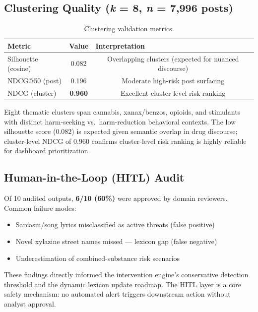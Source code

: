 \documentclass[10pt,twocolumn]{article}
\begin{document}
\subsection*{Clustering Quality (\textit{k} = 8, \textit{n} = 7,996 posts)}

\begin{table}[H]
\centering
\caption{Clustering validation metrics.}
\label{tab:clust}
\scriptsize
\begin{tabularx}{\columnwidth}{@{}lccX@{}}
  \toprule
  \textbf{Metric} & \textbf{Value} & \multicolumn{2}{l}{\textbf{Interpretation}} \\
  \midrule
  Silhouette (cosine) & 0.082 & \multicolumn{2}{X}{Overlapping clusters (expected for nuanced discourse)} \\
  NDCG@50 (post)      & 0.196 & \multicolumn{2}{X}{Moderate high-risk post surfacing} \\
  NDCG (cluster)      & \textbf{0.960} & \multicolumn{2}{X}{Excellent cluster-level risk ranking} \\
  \bottomrule
\end{tabularx}
\end{table}

Eight thematic clusters span cannabis, xanax/benzos, opioids, and stimulants with distinct harm-seeking vs.\ harm-reduction behavioral contexts. The low silhouette score ($0.082$) is expected given semantic overlap in drug discourse; cluster-level NDCG of $0.960$ confirms cluster-level risk ranking is highly reliable for dashboard prioritization.

\subsection*{Human-in-the-Loop (HITL) Audit}

Of 10 audited outputs, \textbf{6/10 (60\%)} were approved by domain reviewers.
Common failure modes:
\begin{itemize}[leftmargin=*, noitemsep, topsep=2pt]
  \item Sarcasm/song lyrics misclassified as active threats (false positive)
  \item Novel xylazine street names missed — lexicon gap (false negative)
  \item Underestimation of combined-substance risk scenarios
\end{itemize}
These findings directly informed the intervention engine's conservative detection threshold and the dynamic lexicon update roadmap. The HITL layer is a core safety mechanism: no automated alert triggers downstream action without analyst approval.
\end{document}
